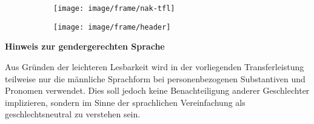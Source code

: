 \pagebreak
\thispagestyle{empty}

\setlength{\parindent}{0pt}

\begin{figure}[t]
	\vspace*{-2.9\baselineskip}
	\begin{subfigure}[b]{0.6\textwidth}
		\texttt{[image: image/frame/nak-tfl]}
	\end{subfigure}
	\begin{subfigure}[b]{0.4\textwidth}
		\texttt{[image: image/frame/header]}
	\end{subfigure}
\end{figure}
\begin{figure}[t]
\end{figure}


\vspace*{\fill}

\large
\textcolor{blue!30!black}{\textbf{Hinweis zur gendergerechten Sprache}}
\newline

\normalsize
Aus Gründen der leichteren Lesbarkeit wird in der vorliegenden Transferleistung teilweise nur die männliche Sprachform bei personenbezogenen Substantiven und Pronomen verwendet. Dies soll jedoch keine Benachteiligung anderer Geschlechter implizieren, sondern im Sinne der sprachlichen Vereinfachung als geschlechtsneutral zu verstehen sein.

\vspace*{\fill}

